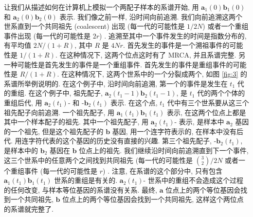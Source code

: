 \documentclass[12pt]{article}
\begin{document}
让我们从描述如何在计算机上模拟一个两配子样本的系谱开始, 用 $\mathbf{a}_{1}(0)\mathbf{b}_{1}(0)$ 和
$\mathbf{a}_{2}(0)\mathbf{b}_{2}(0)$ 表示. 我们像之前一样, 沿时间向前追溯. 我们向前追溯这两个世系直到一个共同祖先
(coalescent) 出现 (每一代的可能性是 $1/2N$) 或者一个重组事件出现 (每一代的可能性是 $2r$) .
追溯至其中一个事件发生的时间是指数分布的, 有平均值 $2N/(1+R)$, 其中 $R$ 是 $4Nr$.
首先发生的事件是一个溯祖事件的可能性是 $1/(1+R)$. 在这种情况下, 这两个位点这时有了 MRCA, 并且系谱完整.
另一种可能性是首先发生的事件是一个重组事件. 首先发生的事件是重组事件的可能性是 $R/(1+R)$. 在这种情况下,
这两个世系中的一个分裂成两个, 如图 \ref{fig:3} 的系谱所举例说明的. 在这个例子中, 沿时间向前追溯, 第一个的事件是发生在 $t_{1}$
代的重组. 在这个例子中, 祖先配子, $\mathbf{a}_{2}(t_{1}-1)\mathbf{b}_{2}(t_{1}-1)$, 是 $t_{1}$
代的两个个体的重组后代, 用 $\mathbf{a}_{2}(t_{1})\text{-}$ 和 $\text{-}\mathbf{b}_{2}(t_{1})$ 表示.
在这个点, $t_{1}$ 代中有三个世系要从这三个祖先配子向前追溯. 一个祖先配子, 用
$\mathbf{a}_{1}(t_{1})\mathbf{b}_{1}(t_{1})$ 表示, 在这两个位点上都是其中一个样本配子的祖先. 其中一个祖先配子,
用 $\mathbf{a}_{2}(t_{1})\text{-}$ 表示, 是样本中 $\mathbf{a}_{2}$ 基因的一个祖先, 但是这个祖先配子的
$\mathbf{b}$ 基因, 用一个连字符表示的, 在样本中没有后代. 用连字符代表的这个基因的历史没有直接的兴趣. 第三个祖先配子,
$\text{-}\mathbf{b}_{2}(t_{1})$, 是样本中的 $\mathbf{b}_{2}$ 基因在 $\mathbf{b}$ 位点上的祖先.
我们继续沿时间向前追溯直到下一个事件, 这三个世系中的任意两个之间找到共同祖先 (每一代的可能性是 $\binom{3}{2}/2N$
或者一个重组事件 (每一代的可能性是 $r$) . 注意, 在系谱的这个部分中, 只有包含
$\mathbf{a}_{1}(t_{1})\mathbf{b}_{1}(t_{1})$ 世系的重组是有关的. $\mathbf{a}_{2}(t_{1})\text{-}$
世系中的重组不会造成这个过程的任何改变, 与样本等位基因的系谱没有关系. 最终, $\mathbf{a}$
位点上的两个等位基因会找到一个共同祖先, $\mathbf{b}$ 位点上的两个等位基因会找到一个共同祖先,
这样这个两位点的系谱就完整了.
\end{document}
